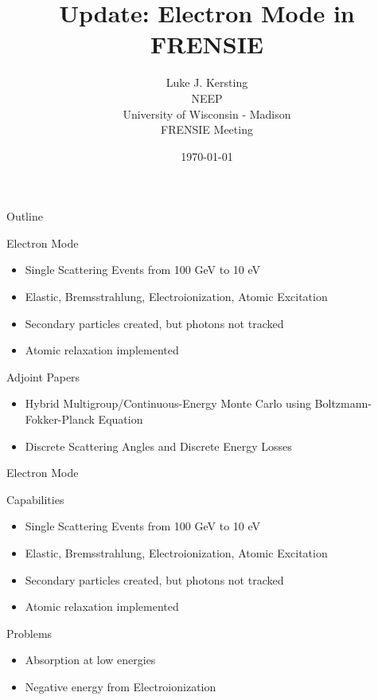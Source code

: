 \documentclass{beamer}
\author{Luke J. Kersting
    \\ NEEP
    \\ University of Wisconsin - Madison
    \\ FRENSIE Meeting
}
\date{\today}
\title{Update: Electron Mode in FRENSIE}
\begin{document}
\maketitle

\begin{frame}{Outline}

  \begin{block}{Electron Mode}
    \begin{itemize}
      \item Single Scattering Events from 100 GeV to 10 eV
      \item Elastic, Bremsstrahlung, Electroionization, Atomic Excitation 
      \item Secondary particles created, but photons not tracked
      \item Atomic relaxation implemented
    \end{itemize}
  \end{block}
    
  \begin{block}{Adjoint Papers}
    \begin{itemize}
      \item Hybrid Multigroup/Continuous-Energy Monte Carlo using Boltzmann-Fokker-Planck Equation
      \item Discrete Scattering Angles and Discrete Energy Losses
    \end{itemize}    
  \end{block}  

\end{frame}

\begin{frame}{Electron Mode}

  \begin{block}{Capabilities}
    \begin{itemize}
      \item Single Scattering Events from 100 GeV to 10 eV
      \item Elastic, Bremsstrahlung, Electroionization, Atomic Excitation 
      \item Secondary particles created, but photons not tracked
      \item Atomic relaxation implemented
    \end{itemize}
  \end{block}
    
  \begin{block}{Problems}
    \begin{itemize}
      \item Absorption at low energies
      \item Negative energy from Electroionization
    \end{itemize}    
  \end{block}  

\end{frame}
\end{document}
